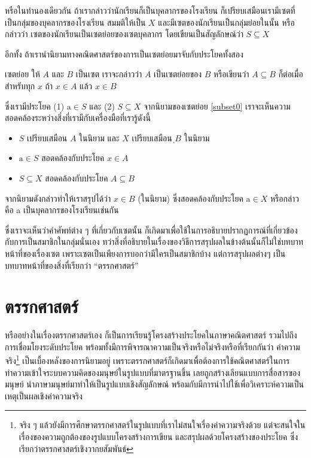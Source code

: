 หรือในทำนองเดียวกัน ถ้าเรากล่าวว่านักเรียนก็เป็นบุคลากรของโรงเรียน ก็เปรียบเสมือนเรามีเซตที่เป็นกลุ่มของบุคลากรของโรงเรียน สมมติให้เป็น $X$ และมีเซตของนักเรียนเป็นกลุ่มย่อยในนั้น หรือกล่าวว่า เซตของนักเรียนเป็นเซตย่อยของเซตบุคลากร โดยเขียนเป็นสัญลักษณ์ว่า $S \subseteq X$

อีกทั้ง ถ้าเรานำนิยามทางคณิตศาสตร์ของการเป็นเซตย่อยมาจับกับประโยคทั้งสอง
\begin{defn}[label=subset0]{เซตย่อย}{} 
	ให้ $A$ และ $B$ เป็นเซต เราจะกล่าวว่า $A$ เป็นเซตย่อยของ $B$ หรือเขียนว่า $A \subseteq B$ ก็ต่อเมื่อ สำหรับทุก $x$ ถ้า $x\in A$ แล้ว $x\in B$
\end{defn}
\noindent ซึ่งเรามีประโยค (1) $\text{a} \in S$ และ (2) $S \subseteq X$ จากนิยามของเซตย่อย \ref{subset0} เราจะเห็นความสอดคล้องระหว่างสิ่งที่เรามีกับเครื่องมือที่เรารู้ดังนี้
\begin{itemize}
	\item $S$ เปรียบเสมือน $A$ ในนิยาม และ $X$ เปรียบเสมือน $ฺB$ ในนิยาม
	\item $\text{a} \in S$ สอดคล้องกับประโยค $x\in A$
	\item $S \subseteq X$ สอดคล้องกับประโยค $A \subseteq B$
\end{itemize}
จากนิยามดังกล่าวทำให้เราสรุปได้ว่า $x\in B$ (ในนิยาม) ซึ่งสอดคล้องกับประโยค $\text{a} \in X $
หรือกล่าวคือ a เป็นบุคลากรของโรงเรียนเช่นกัน

ซึ่งเราจะเห็นว่าคำศัพท์ต่าง ๆ ที่เกี่ยวกับเซตนั้น ก็เกิดมาเพื่อใช้ในการอธิบายปรากฏการณ์ที่เกี่ยวข้องกับการเป็นสมาชิกในกลุ่มนั่นเอง
ทว่าสิ่งที่อธิบายในเรื่องของวิธีการสรุปผลในข้างต้นนั้นก็ไม่ใช่บทบาทหน้าที่ของเรื่องเซต เพราะเซตเป็นเพียงการบอกว่ามีใครเป็นสมาชิกบ้าง แต่การสรุปผลต่างๆ เป็นบทบาทหน้าที่ของสิ่งที่เรียกว่า ``ตรรกศาสตร์''

\section{ตรรกศาสตร์}
หรืออย่างในเรื่องตรรกศาสตร์เอง ก็เป็นการเรียนรู้โครงสร้างประโยคในภาษาคณิตศาสตร์ รวมไปถึงการเชื่อมโยงระดับประโยค พร้อมทั้งมีการพิจารณาความเป็นจริงหรือไม่จริงหรือที่เรียกกันว่า ค่าความจริง\footnote{จริง ๆ แล้วยังมีการศึกษาตรรกศาสตร์ในรูปแบบที่เราไม่สนใจเรื่องค่าความจริงด้วย แต่จะสนใจในเรื่องของความถูกต้องของรูปแบบโครงสร้างการเขียน และสรุปผลด้วยโครงสร้างของประโยค ซึ่งเรียกว่าตรรกศาสตร์เชิงวากยสัมพันธ์} เป็นเบื้องหลังของการนิยามอยู่ เพราะตรรกศาสตร์ก็เกิดมาเพื่อต้องการใช้คณิตศาสตร์ในการทำความเข้าใจระบบความคิดของมนุษย์ในรูปแบบที่มาตรฐานขึ้น เลยถูกสร้างเลียนแบบการสื่อสารของมนุษย์ นำภาษามนุษย์มาทำให้เป็นรูปแบบเชิงสัญลักษณ์ พร้อมกับมีการนำไปใช้เพื่อวิเคราะห์ความเป็นเหตุเป็นผลเชิงค่าความจริง

